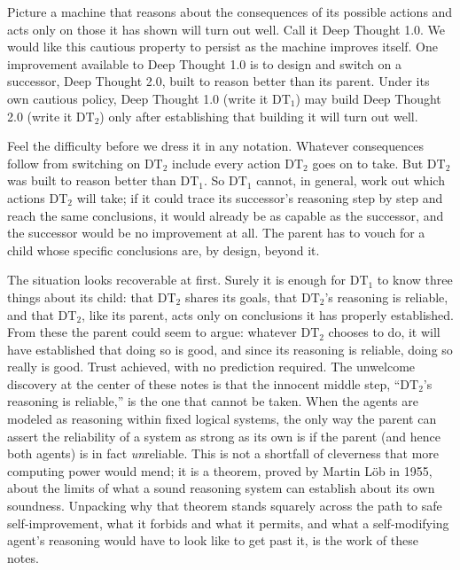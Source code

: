 \documentclass[10pt]{article}
\theoremstyle{definition}
\theoremstyle{remark}
\begin{document}
Picture a machine that reasons about the consequences of its possible actions and acts only on those it has shown will turn out well. Call it Deep Thought 1.0. We would like this cautious property to persist as the machine improves itself. One improvement available to Deep Thought 1.0 is to design and switch on a successor, Deep Thought 2.0, built to reason better than its parent. Under its own cautious policy, Deep Thought 1.0 (write it $\mathrm{DT}_1$) may build Deep Thought 2.0 (write it $\mathrm{DT}_2$) only after establishing that building it will turn out well.

Feel the difficulty before we dress it in any notation. Whatever consequences follow from switching on $\mathrm{DT}_2$ include every action $\mathrm{DT}_2$ goes on to take. But $\mathrm{DT}_2$ was built to reason better than $\mathrm{DT}_1$. So $\mathrm{DT}_1$ cannot, in general, work out which actions $\mathrm{DT}_2$ will take; if it could trace its successor's reasoning step by step and reach the same conclusions, it would already be as capable as the successor, and the successor would be no improvement at all. The parent has to vouch for a child whose specific conclusions are, by design, beyond it.

The situation looks recoverable at first. Surely it is enough for $\mathrm{DT}_1$ to know three things about its child: that $\mathrm{DT}_2$ shares its goals, that $\mathrm{DT}_2$'s reasoning is reliable, and that $\mathrm{DT}_2$, like its parent, acts only on conclusions it has properly established. From these the parent could seem to argue: whatever $\mathrm{DT}_2$ chooses to do, it will have established that doing so is good, and since its reasoning is reliable, doing so really is good. Trust achieved, with no prediction required. The unwelcome discovery at the center of these notes is that the innocent middle step, ``$\mathrm{DT}_2$'s reasoning is reliable,'' is the one that cannot be taken. When the agents are modeled as reasoning within fixed logical systems, the only way the parent can assert the reliability of a system as strong as its own is if the parent (and hence both agents) is in fact \emph{un}reliable. This is not a shortfall of cleverness that more computing power would mend; it is a theorem, proved by Martin L\"ob in 1955, about the limits of what a sound reasoning system can establish about its own soundness. Unpacking why that theorem stands squarely across the path to safe self-improvement, what it forbids and what it permits, and what a self-modifying agent's reasoning would have to look like to get past it, is the work of these notes.
\end{document}
